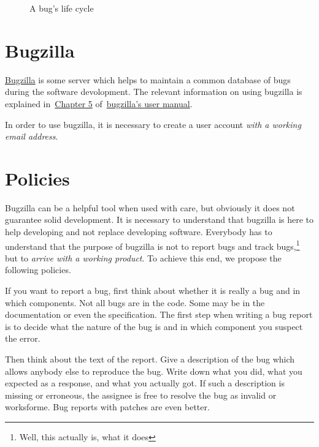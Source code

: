 \documentclass[11pt,handout]{handout}
\begin{document}
\begin{figure}
  \centering
  \caption{A bug's life cycle}
  \label{fig:lifecycle}
\end{figure}






\section{Bugzilla}

\href{http://www.bugzilla.org}{Bugzilla} is some server which helps to
maintain a common database of bugs during the software devolopment.  The
relevant information on using bugzilla is explained
in~\href{http://www.bugzilla.org/docs/2.18/html/using-intro.html}{Chapter 5}
of~\href{http://www.bugzilla.org/docs/2.18/html/}{bugzilla's user manual}.

In order to use bugzilla, it is necessary to create a user account
\emph{with a working email address}.





\section{Policies}

Bugzilla can be a helpful tool when used with care, but obviously it does
not guarantee solid development.  It is necessary to understand that
bugzilla is here to help developing and not replace developing software.
Everybody has to understand that the purpose of bugzilla is not to
report bugs and track bugs,\footnote{Well, this actually is, what it does}
but to \emph{arrive with a working product}.  To achieve this end, we
propose the following policies.

If you want to report a bug, first think about whether it is really a
bug and in which components.  Not all bugs are in the code.  Some may
be in the documentation or even the specification.  The first step when
writing a bug report is to decide what the nature of the bug is and in
which component you suspect the error.

Then think about the text of the report.  Give a description of the bug
which allows anybody else to reproduce the bug.  Write down what you did,
what you expected as a response, and what you actually got.  If such a
description is missing or erroneous, the assignee is free to resolve
the bug as invalid or worksforme.  Bug reports with patches are even
better.
\end{document}
